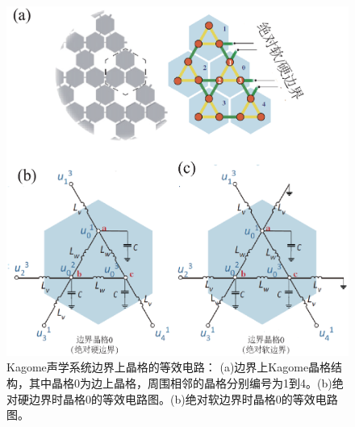 \begin{figure}[h!]
  \centering
  \includegraphics[width=1\textwidth]{images/fig3-3.eps} 
  \caption{Kagome声学系统边界上晶格的等效电路：
  (a)边界上Kagome晶格结构，其中晶格0为边上晶格，周围相邻的晶格分别编号为1到4。(b)绝对硬边界时晶格0的等效电路图。(b)绝对软边界时晶格0的等效电路图。
  }
  \label{fig_3_3}
\end{figure}

